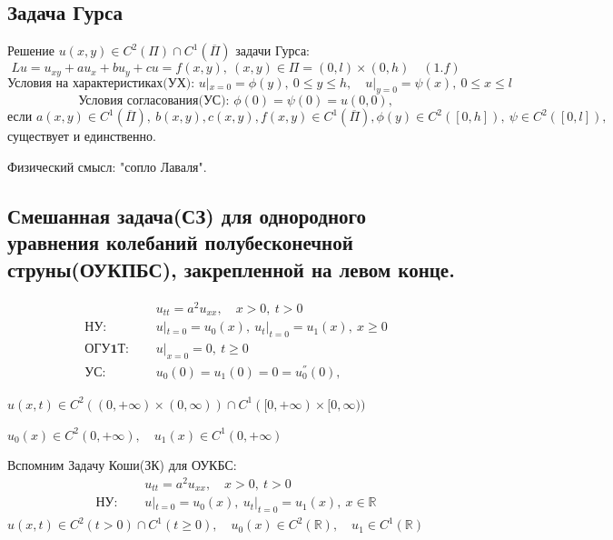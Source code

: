 \subsection{Задача Гурса}
\begin{theorem}
	Решение $u(x, y) \in C^2(\Pi) \cap C^1(\overline{\Pi})$ задачи Гурса:
	\[
		Lu = u_{xy} + a u_x + b u_y + cu = f(x, y),\ (x, y) \in \Pi = (0, l) \times (0, h) \quad (1.f)
	\]
	\[
		\textbf{Условия на характеристиках(УХ): } u|_{x=0} = \phi(y),\ 0 \le y
		\le h,\quad
		u|_{y=0} = \psi(x),\ 0 \le x \le l
	\]
	\[
		\textbf{Условия согласования(УС): } \phi(0) = \psi(0) = u(0, 0),
	\]
	\[\text{если } a(x, y) \in C^1(\overline{\Pi}),\ b(x, y), c(x, y), f(x, y) \in C^1(\overline{\Pi}), \phi(y) \in C^2([0, h]),\ \psi \in C^2([0, l]),
	\] существует и единственно.
\end{theorem}

Физический смысл: "сопло Лаваля".

\subsection{Смешанная задача(СЗ) для однородного уравнения колебаний полубесконечной струны(ОУКПБС), закрепленной на левом конце.}

\begin{align*}
	                       & u_{tt} = a^2 u_{xx}, \quad x > 0,\ t > 0 \tag{1.0}    \\
	\textbf{НУ: } \quad    & u|_{t=0}=u_0(x),\ u_t|_{t=0}=u_1(x),\ x \ge 0 \tag{2} \\
	\textbf{ОГУ1Т: } \quad & u|_{x=0}=0,\ t \ge 0 \tag{3.1.0}                      \\
	\textbf{УС: } \quad    & u_0(0)=u_1(0)=0=u_0^{''}(0), \tag{4.1.0}
\end{align*}

$u(x, t) \in C^2((0, +\infty) \times (0, \infty)) \cap C^1([0, +\infty) \times [0, \infty))$

$u_0(x) \in C^2(0, +\infty),\quad u_1(x) \in C^1(0, +\infty)$

Вспомним Задачу Коши(ЗК) для ОУКБС:
\begin{align*}
	                    & u_{tt} = a^2 u_{xx}, \quad x > 0,\ t > 0 \tag{1.0}             \\
	\textbf{НУ: } \quad & u|_{t=0}=u_0(x),\ u_t|_{t=0}=u_1(x),\ x \in \mathbb{R} \tag{2}
\end{align*}
$u(x, t) \in C^2(t>0) \cap C^1(t \ge 0),\quad u_0(x) \in C^2(\mathbb{R}),\quad u_1 \in C^1(\mathbb{R})$

